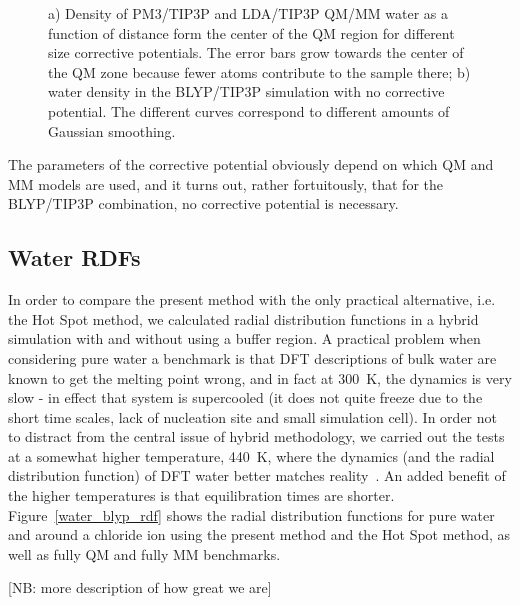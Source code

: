 \documentclass[11pt]{revtex4}
\begin{document}
\begin{figure}
\caption{a) Density of PM3/TIP3P and LDA/TIP3P QM/MM water as a function of distance form the center of the QM region for different size corrective potentials. The error bars grow towards the center of the QM zone because fewer atoms contribute to the sample there; b) water density in the BLYP/TIP3P simulation with no corrective potential. The different curves correspond to different amounts of Gaussian smoothing.}
\label{density}
\end{figure}

The parameters of the corrective potential obviously depend on which QM and MM models are used, and it turns out, rather fortuitously, that for the BLYP/TIP3P combination, no corrective potential is necessary. 

\subsection{Water RDFs}
In order to compare the present method with the only practical alternative, i.e. the Hot Spot method, we calculated radial distribution functions in a hybrid simulation with and without using a buffer region.  A practical problem when considering pure water a benchmark is that DFT descriptions of bulk water are known to get the melting point wrong, and in fact at 300~K, the dynamics is very slow - in effect that system is supercooled (it does not quite freeze due to the short time scales, lack of nucleation site and small simulation cell). In order not to distract from the central issue of hybrid methodology, we carried out the tests at a somewhat higher temperature, 440~K, where the dynamics (and the radial distribution function) of DFT water better matches reality~\cite{yoo_j_chem_phys_2009a}. An added benefit of the higher temperatures is that equilibration times are shorter. Figure~\ref{water_blyp_rdf} shows the radial distribution functions for pure water and around a chloride ion using the present method and the Hot Spot method, as well as fully QM and fully MM benchmarks.

[NB: more description of how great we are]
\end{document}
